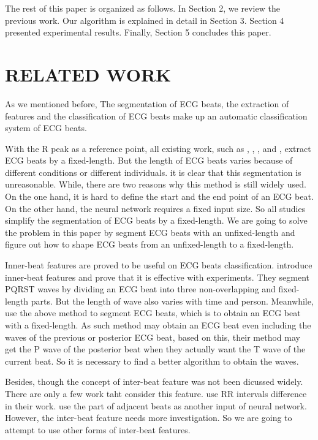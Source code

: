 \documentclass[wcp]{jmlr}
\begin{document}
  
The rest of this paper is organized as follows. In Section 2, we review the previous work. Our algorithm is explained in detail in Section 3. Section 4 presented experimental results. Finally, Section 5 concludes this paper.
\section{RELATED WORK}
As we mentioned before, The segmentation of ECG beats, the extraction of features and the classification of ECG beats make up an automatic classification system of ECG beats.


With the R peak as a reference point, all existing work, such as \cite{ye2012combining}, \cite{kiranyaz2016real}, \cite{zubair2016automated}, \cite{salloum2017ecg} and \cite{ye2012heartbeat}, extract ECG beats by a fixed-length. But the length of ECG beats varies because of different conditions or different individuals. it is clear that this segmentation is unreasonable. While, there are two reasons why this method is still widely used. On the one hand, it is hard to define the start and the end point of an ECG beat. On the other hand, the neural network requires a fixed input size. So all studies simplify the segmentation of ECG beats by a fixed-length. We are going to solve the problem in this paper by segment ECG beats with an unfixed-length and figure out how to shape ECG beats from an unfixed-length to a fixed-length.


Inner-beat features are proved to be useful on ECG beats classification. \cite{xiang2018ecg} introduce inner-beat features and prove that it is effective with experiments. They segment PQRST waves by dividing an ECG beat into three non-overlapping and fixed-length parts. But the length of wave also varies with time and person. Meanwhile, \cite{xiang2018ecg} use the above method to segment ECG beats, which is to obtain an ECG beat with a fixed-length. As such method may obtain an ECG beat even including the waves of the previous or posterior ECG beat, based on this, their method may get the P wave of the posterior beat when they actually want the T wave of the current beat. So it is necessary to find a better algorithm to obtain the waves.

Besides, though the concept of inter-beat feature was not been dicussed widely. There are only a few work taht consider this feature. \cite{xiang2018ecg} use RR intervals difference in their work. \cite{kiranyaz2016real} use the part of adjacent beats as another input of neural network. However, the inter-beat feature needs more investigation. So we are going to attempt to use other forms of inter-beat features.
\end{document}
